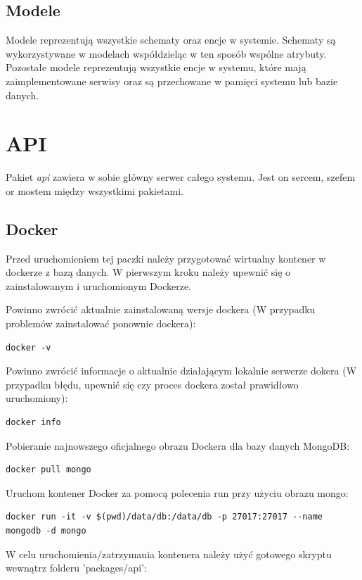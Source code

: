 \subsection{Modele}
Modele reprezentują wszystkie schematy oraz encje w systemie.
Schematy są wykorzystywane w modelach współdzieląc w ten sposób wspólne atrybuty. Pozostałe modele reprezentują wszystkie encje w systemu, które mają zaimplementowane serwisy oraz są przechowane w pamięci systemu lub bazie danych.

\section{API}
Pakiet \textit{api} zawiera w sobie główny serwer całego systemu. Jest on sercem, szefem or mostem między wszystkimi pakietami.

\subsection{Docker}
Przed uruchomieniem tej paczki należy przygotować wirtualny kontener w dockerze z bazą danych. W pierwszym kroku należy upewnić się o zainstalowanym i uruchomionym Dockerze.

Powinno zwrócić aktualnie zainstalowaną wersje dockera (W przypadku problemów zainstalować ponownie dockera):
\begin{lstlisting}
docker -v
\end{lstlisting}

Powinno zwrócić informacje o aktualnie działającym lokalnie serwerze dokera (W przypadku błędu, upewnić się czy proces dockera został prawidłowo uruchomiony):
\begin{lstlisting}
docker info
\end{lstlisting}

Pobieranie najnowszego oficjalnego obrazu Dockera dla bazy danych MongoDB:

\begin{lstlisting}
docker pull mongo
\end{lstlisting}

Uruchom kontener Docker za pomocą polecenia run przy użyciu obrazu mongo:

\begin{lstlisting}[breaklines=true]
docker run -it -v $(pwd)/data/db:/data/db -p 27017:27017 --name mongodb -d mongo
\end{lstlisting}

W celu uruchomienia/zatrzymania kontenera należy użyć gotowego skryptu wewnątrz folderu 'packages/api':

